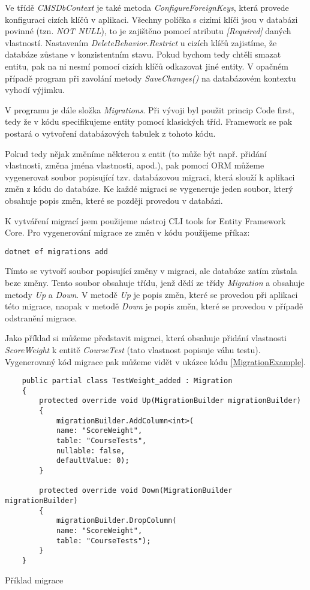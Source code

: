 Ve třídě \textit{CMSDbContext} je také metoda \textit{ConfigureForeignKeys}, která provede konfiguraci cizích klíčů v aplikaci. Všechny políčka s cizími klíči jsou v databázi povinné (tzn. \textit{NOT NULL}), to je zajištěno pomocí atributu \textit{[Required]} daných vlastností. Nastavením \textit{DeleteBehavior.Restrict} u cizích klíčů zajistíme, že databáze zůstane v konzistentním stavu. Pokud bychom tedy chtěli smazat entitu, pak na ni nesmí pomocí cizích klíčů odkazovat jiné entity. V opačném případě program při zavolání metody \textit{SaveChanges()} na databázovém kontextu vyhodí výjimku.

V programu je dále složka \textit{Migrations}. Při vývoji byl použit princip Code first, tedy že v kódu specifikujeme entity pomocí klasických tříd. Framework se pak postará o vytvoření databázových tabulek z tohoto kódu.

Pokud tedy nějak změníme některou z entit (to může být např. přidání vlastnosti, změna jména vlastnosti, apod.), pak pomocí ORM můžeme vygenerovat soubor popisující tzv. databázovou migraci, která slouží k aplikaci změn z kódu do databáze. Ke každé migraci se vygeneruje jeden soubor, který obsahuje popis změn, které se později provedou v databázi.

K vytváření migrací jsem použijeme nástroj CLI tools for Entity Framework Core. \cite{EfCoreCliDocs} Pro vygenerování migrace ze změn v kódu použijeme příkaz:

\begin{lstlisting}
dotnet ef migrations add 
\end{lstlisting}

Tímto se vytvoří soubor popisující změny v migraci, ale databáze zatím zůstala beze změny. Tento soubor obsahuje třídu, jenž dědí ze třídy \textit{Migration} a obsahuje metody \textit{Up} a \textit{Down}. V metodě \textit{Up} je popis změn, které se provedou při aplikaci této migrace, naopak v metodě \textit{Down} je popis změn, které se provedou v případě odstranění migrace.

Jako příklad si můžeme představit migraci, která obsahuje přidání vlastnosti \textit{ScoreWeight} k entitě \textit{CourseTest} (tato vlastnost popisuje váhu testu).
Vygenerovaný kód migrace pak můžeme vidět v ukázce kódu \ref{MigrationExample}.

\begin{program}
	\begin{lstlisting}
	public partial class TestWeight_added : Migration
	{
		protected override void Up(MigrationBuilder migrationBuilder)
		{
			migrationBuilder.AddColumn<int>(
			name: "ScoreWeight",
			table: "CourseTests",
			nullable: false,
			defaultValue: 0);
		}
		
		protected override void Down(MigrationBuilder migrationBuilder)
		{
			migrationBuilder.DropColumn(
			name: "ScoreWeight",
			table: "CourseTests");
		}
	}
	\end{lstlisting}
	\caption{Příklad migrace}
	\label{MigrationExample}
\end{program}

